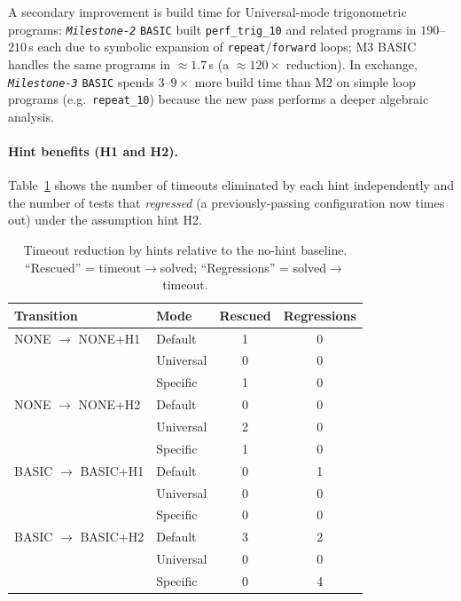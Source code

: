 A secondary improvement is build time for Universal-mode trigonometric programs:
\textit{\texttt{Milestone-2}} \texttt{BASIC} built \texttt{perf\_trig\_10} and related programs in $190$--$210$\,s each
due to symbolic expansion of \texttt{repeat}/\texttt{forward} loops; M3 BASIC
handles the same programs in $\approx 1.7$\,s (a $\approx 120\times$ reduction).
In exchange, \textit{\texttt{Milestone-3}} \texttt{BASIC} spends $3$--$9\times$ more build time than M2 on simple loop
programs (e.g.\ \texttt{repeat\_10}) because the new pass performs a deeper algebraic
analysis.

\paragraph{Hint benefits (H1 and H2).}
Table~\ref{tab:hint-gain-m3} shows the number of timeouts eliminated by each hint
independently and the number of tests that \emph{regressed} (a previously-passing
configuration now times out) under the assumption hint H2.

\begin{table}[H]
\centering
\caption{Timeout reduction by hints relative to the no-hint baseline.
``Rescued'' = timeout$\to$solved; ``Regressions'' = solved$\to$timeout.}
\label{tab:hint-gain-m3}
\begin{tabular}{llcc}
\toprule
\textbf{Transition} & \textbf{Mode} & \textbf{Rescued} & \textbf{Regressions} \\
\midrule
NONE $\to$ NONE+H1   & Default   & 1 & 0 \\
                      & Universal & 0 & 0 \\
                      & Specific  & 1 & 0 \\
\midrule
NONE $\to$ NONE+H2   & Default   & 0 & 0 \\
                      & Universal & 2 & 0 \\
                      & Specific  & 1 & 0 \\
\midrule
BASIC $\to$ BASIC+H1 & Default   & 0 & 1 \\
                      & Universal & 0 & 0 \\
                      & Specific  & 0 & 0 \\
\midrule
BASIC $\to$ BASIC+H2 & Default   & 3 & 2 \\
                      & Universal & 0 & 0 \\
                      & Specific  & 0 & 4 \\
\bottomrule
\end{tabular}
\end{table}

